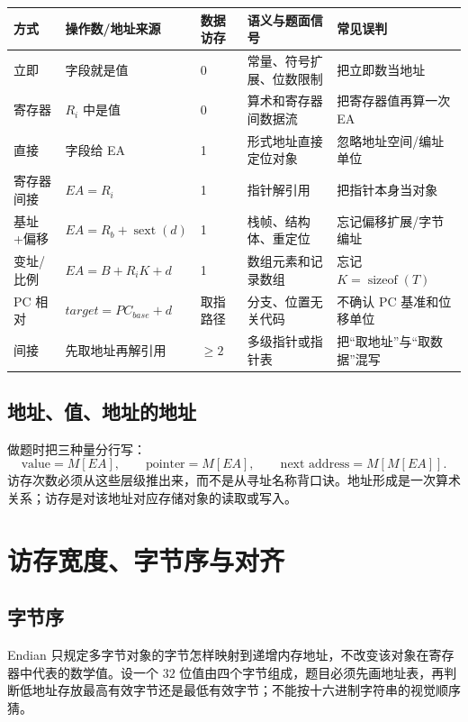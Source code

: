 \documentclass[UTF8,fontset=fandol,11pt,a4paper]{ctexart}
\begin{document}
\begin{center}

\end{center}

\begin{center}
\small
\begin{tabularx}{\linewidth}{L{2.2cm}C{1.8cm}C{1.2cm}Y Y}
\toprule
方式 & 操作数/地址来源 & 数据访存 & 语义与题面信号 & 常见误判\\
\midrule
立即 & 字段就是值 & 0 & 常量、符号扩展、位数限制 & 把立即数当地址\\
寄存器 & $R_i$ 中是值 & 0 & 算术和寄存器间数据流 & 把寄存器值再算一次 EA\\
直接 & 字段给 EA & 1 & 形式地址直接定位对象 & 忽略地址空间/编址单位\\
寄存器间接 & $EA=R_i$ & 1 & 指针解引用 & 把指针本身当对象\\
基址+偏移 & $EA=R_b+\operatorname{sext}(d)$ & 1 & 栈帧、结构体、重定位 & 忘记偏移扩展/字节编址\\
变址/比例 & $EA=B+R_iK+d$ & 1 & 数组元素和记录数组 & 忘记 $K=\operatorname{sizeof}(T)$\\
PC 相对 & $target=PC_{base}+d$ & 取指路径 & 分支、位置无关代码 & 不确认 PC 基准和位移单位\\
间接 & 先取地址再解引用 & $\ge2$ & 多级指针或指针表 & 把“取地址”与“取数据”混写\\
\bottomrule
\end{tabularx}
\end{center}

\subsection{地址、值、地址的地址}
做题时把三种量分行写：
\[
\text{value}=M[EA],\qquad
\text{pointer}=M[EA],\qquad
\text{next address}=M[M[EA]].
\]
访存次数必须从这些层级推出来，而不是从寻址名称背口诀。地址形成是一次算术关系；访存是对该地址对应存储对象的读取或写入。

\section{访存宽度、字节序与对齐}

\subsection{字节序}
Endian 只规定多字节对象的字节怎样映射到递增内存地址，不改变该对象在寄存器中代表的数学值。设一个 $32$ 位值由四个字节组成，题目必须先画地址表，再判断低地址存放最高有效字节还是最低有效字节；不能按十六进制字符串的视觉顺序猜。
\end{document}
